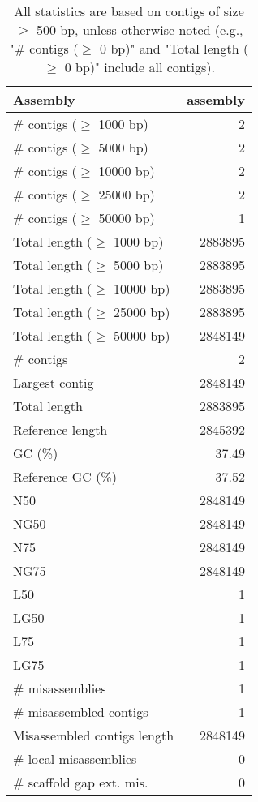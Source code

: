 \documentclass[12pt,a4paper]{article}
\begin{document}
\begin{table}[ht]
\begin{center}
\caption{All statistics are based on contigs of size $\geq$ 500 bp, unless otherwise noted (e.g., "\# contigs ($\geq$ 0 bp)" and "Total length ($\geq$ 0 bp)" include all contigs).}
\begin{tabular}{|l*{1}{|r}|}
\hline
Assembly & assembly \\ \hline
\# contigs ($\geq$ 1000 bp) & 2 \\ \hline
\# contigs ($\geq$ 5000 bp) & 2 \\ \hline
\# contigs ($\geq$ 10000 bp) & 2 \\ \hline
\# contigs ($\geq$ 25000 bp) & 2 \\ \hline
\# contigs ($\geq$ 50000 bp) & 1 \\ \hline
Total length ($\geq$ 1000 bp) & 2883895 \\ \hline
Total length ($\geq$ 5000 bp) & 2883895 \\ \hline
Total length ($\geq$ 10000 bp) & 2883895 \\ \hline
Total length ($\geq$ 25000 bp) & 2883895 \\ \hline
Total length ($\geq$ 50000 bp) & 2848149 \\ \hline
\# contigs & 2 \\ \hline
Largest contig & 2848149 \\ \hline
Total length & 2883895 \\ \hline
Reference length & 2845392 \\ \hline
GC (\%) & 37.49 \\ \hline
Reference GC (\%) & 37.52 \\ \hline
N50 & 2848149 \\ \hline
NG50 & 2848149 \\ \hline
N75 & 2848149 \\ \hline
NG75 & 2848149 \\ \hline
L50 & 1 \\ \hline
LG50 & 1 \\ \hline
L75 & 1 \\ \hline
LG75 & 1 \\ \hline
\# misassemblies & 1 \\ \hline
\# misassembled contigs & 1 \\ \hline
Misassembled contigs length & 2848149 \\ \hline
\# local misassemblies & 0 \\ \hline
\# scaffold gap ext. mis. & 0 \\ \hline

\end{tabular}
\end{center}
\end{table}
\end{document}
